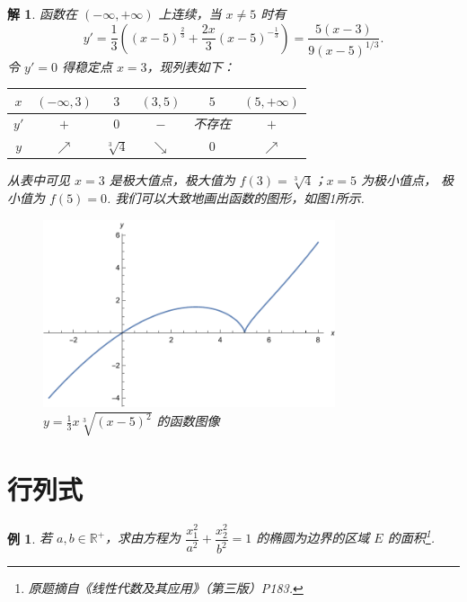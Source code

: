 \documentclass[UTF8,11pt]{ctexart}
\newtheorem{sample}{例}
\newtheorem*{solution}{解}
\begin{document}
\begin{solution}
    函数在 $(-\infty, +\infty)$ 上连续，当 $x \neq 5$ 时有
    \begin{equation}
        \label{eq:jizhi}
        y'= \frac{1}{3} \left( (x-5) ^ \frac{2}{3} + \frac{2x}{3} (x-5) 
        ^ {-\frac{1}{3}} \right) = \frac{5(x-3)} {9(x-5) ^ {1/3}} .
    \end{equation}
    令 $y' = 0$ 得稳定点 $x = 3$，现列表如下：

    \begin{table}[htbp]
        \centering
        \begin{tabular}{|c|c|c|c|c|c|} \hline
            $x$ &  $(-\infty , 3)$ & $3$ & $(3 , 5)$ & $5$ & $(5 , +\infty)$\\ \hline
            $y'$ & $+$ & $0$ & $-$ & 不存在 & $+$\\ \hline
            $y$ & $\nearrow$ & $\sqrt[3]{4}$ & $\searrow$ & $0$ & $\nearrow$\\ \hline
        \end{tabular}
    \end{table}
    从表中可见 $x = 3$ 是极大值点，极大值为 $f(3) = \sqrt[3]{4}$；$x = 5$ 为极小值点，
    极小值为 $f(5) = 0$. 我们可以大致地画出函数的图形，如图1所示.
    
    \newpage
    \begin{figure}[htbp]
        \centering
        \includegraphics[width=8.6cm]{fig/function.pdf}
        \caption{$y = \frac{1}{3} x \sqrt[3]{(x-5)^2}$ 的函数图像}
        \label{fig:function}
    \end{figure}
\end{solution}

\section{行列式}
\begin{sample}
    若 $a, b \in \mathbb{R^+}$，求由方程为 $\dfrac{x^2_1}{a^2} + \dfrac{x^2_2}{b^2} = 1$ 的椭圆为边界的区域 $E$ 的面积\footnote{原题摘自《线性代数及其应用》（第三版）P183.}.
\end{sample}
\end{document}
